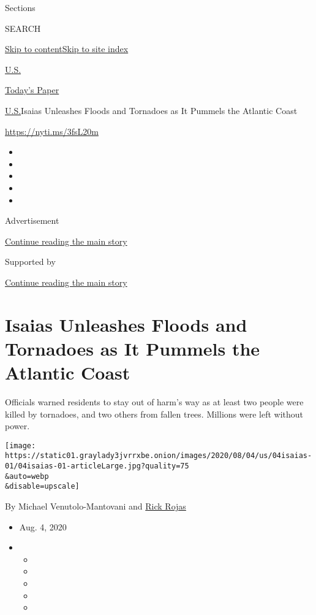 Sections

SEARCH

\protect\hyperlink{site-content}{Skip to
content}\protect\hyperlink{site-index}{Skip to site index}

\href{https://www.nytimes3xbfgragh.onion/section/us}{U.S.}

\href{https://myaccount.nytimes3xbfgragh.onion/auth/login?response_type=cookie\&client_id=vi}{}

\href{https://www.nytimes3xbfgragh.onion/section/todayspaper}{Today's
Paper}

\href{/section/us}{U.S.}\textbar{}Isaias Unleashes Floods and Tornadoes
as It Pummels the Atlantic Coast

\url{https://nyti.ms/3fsL20m}

\begin{itemize}
\item
\item
\item
\item
\item
\end{itemize}

Advertisement

\protect\hyperlink{after-top}{Continue reading the main story}

Supported by

\protect\hyperlink{after-sponsor}{Continue reading the main story}

\hypertarget{isaias-unleashes-floods-and-tornadoes-as-it-pummels-the-atlantic-coast}{%
\section{Isaias Unleashes Floods and Tornadoes as It Pummels the
Atlantic
Coast}\label{isaias-unleashes-floods-and-tornadoes-as-it-pummels-the-atlantic-coast}}

Officials warned residents to stay out of harm's way as at least two
people were killed by tornadoes, and two others from fallen trees.
Millions were left without power.

\texttt{[image: https://static01.graylady3jvrrxbe.onion/images/2020/08/04/us/04isaias-01/04isaias-01-articleLarge.jpg?quality=75\\\&auto=webp\\\&disable=upscale]}

By Michael Venutolo-Mantovani and
\href{https://www.nytimes3xbfgragh.onion/by/rick-rojas}{Rick Rojas}

\begin{itemize}
\item
  Aug. 4, 2020
\item
  \begin{itemize}
  \item
  \item
  \item
  \item
  \item
  \end{itemize}
\end{itemize}

